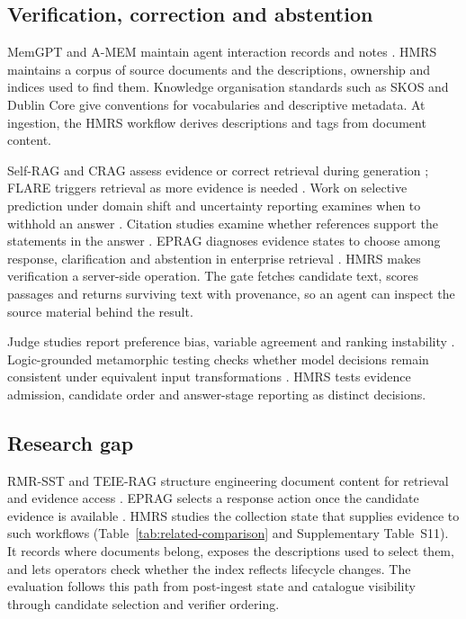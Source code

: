 \subsection{Verification, correction and abstention}

MemGPT and A-MEM maintain agent interaction records and notes
\citep{memgpt,amem}. HMRS maintains a corpus of source
documents and the descriptions, ownership and indices used to find them.
Knowledge organisation standards such as SKOS \citep{skos} and Dublin Core
\citep{dcmi-terms}
give conventions for vocabularies and descriptive metadata. At ingestion,
the HMRS workflow derives descriptions and tags from document content.

Self-RAG and CRAG assess evidence or correct retrieval during generation
\citep{selfrag,crag}; FLARE triggers retrieval as more evidence is needed
\citep{flare}. Work on selective prediction under domain shift and
uncertainty reporting examines when to withhold an answer
\citep{kamath,feng-abstain,yin-knowwhat}. Citation studies examine whether
references support the statements in the answer
\citep{liu-verifiability,gao-citations}.
EPRAG diagnoses evidence states to choose among response, clarification and
abstention in enterprise retrieval \citep{kinalioglu-kbs-eprag-2026}.
HMRS makes verification a server-side operation. The gate fetches
candidate text, scores passages and returns surviving text with provenance,
so an agent can inspect the source material behind the result.

Judge studies report preference bias, variable agreement and ranking
instability \citep{zheng-llmjudge,sun-urara,panickssery-selfpref}.
Logic-grounded metamorphic testing checks whether model decisions remain
consistent under equivalent input transformations \citep{zhou2026lgmt}.
HMRS tests evidence admission, candidate order and answer-stage reporting
as distinct decisions.

\subsection{Research gap}
\label{sec:gap}

RMR-SST and TEIE-RAG structure engineering document content for retrieval
and evidence access \citep{li-kbs-rmrsst-2026,shen-kbs-teierag-2026}. EPRAG
selects a response action once the candidate evidence is available
\citep{kinalioglu-kbs-eprag-2026}. HMRS studies the collection state that
supplies evidence to such workflows (Table~\ref{tab:related-comparison}
and Supplementary Table~S11). It records where documents belong, exposes
the descriptions used to select them, and lets operators check whether
the index reflects lifecycle changes. The evaluation follows this path from
post-ingest state and catalogue visibility through candidate selection and
verifier ordering.
